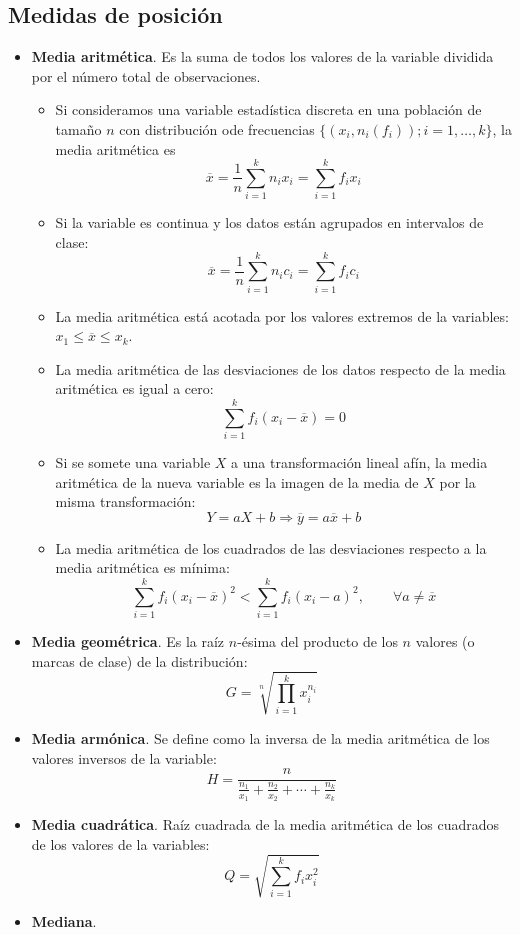 \documentclass[]{article}
\begin{document}
	\subsection{Medidas de posición}
	
	\begin{itemize}
		\item \textbf{Media aritmética}. Es la suma de todos los valores de la variable dividida por el número total de observaciones.
		\begin{itemize}
			\item Si consideramos una variable estadística discreta en una población de tamaño $n$ con distribución ode frecuencias $\{(x_i, n_i(f_i)); i = 1, \dots, k\}$, la media aritmética es $$\overline{x} = \dfrac{1}{n} \sum_{i = 1}^k n_i x_i = \sum_{i = 1}^k f_i x_i$$
			\item Si la variable es continua y los datos están agrupados en intervalos de clase:
			$$\overline{x} = \dfrac{1}{n} \sum_{i = 1}^k n_i c_i = \sum_{i = 1}^k f_i c_i$$
			\item La media aritmética está acotada por los valores extremos de la variables: $x_1 \leq \overline{x} \leq x_k$.
			\item La media aritmética de las desviaciones de los datos respecto de la media aritmética es igual a cero: $$\sum_{i = 1}^k f_i (x_i - \overline{x}) = 0$$
			\item Si se somete una variable $X$ a una transformación lineal afín, la media aritmética de la nueva variable es la imagen de la media de $X$ por la misma transformación:
			$$Y = aX + b \Longrightarrow \overline{y} = a \overline{x} + b$$
			\item La media aritmética de los cuadrados de las desviaciones respecto a la media aritmética es mínima:
			$$\sum_{i = 1}^k f_i (x_i - \overline{x})^2 < \sum_{i = 1}^k f_i (x_i - a)^2, \qquad \forall a \neq \overline{x}$$
		\end{itemize}
	\item \textbf{Media geométrica}. Es la raíz $n$-ésima del producto de los $n$ valores (o marcas de clase) de la distribución: $$G = \sqrt[n]{\prod_{i=1}^{k} x_i ^ {n_i}}$$
	\item \textbf{Media armónica}. Se define como la inversa de la media aritmética de los valores inversos de la variable:
	$$H = \dfrac{n}{\frac{n_1}{x_1} + \frac{n_2}{x_2} + \cdots + \frac{n_k}{x_k}}$$
	\item \textbf{Media cuadrática}. Raíz cuadrada de la media aritmética de los cuadrados de los valores de la variables:
	$$Q = \sqrt{\sum_{i=1}^{k} f_i x_i^2}$$
	\item \textbf{Mediana}.
	\end{itemize}

	
\end{document}
